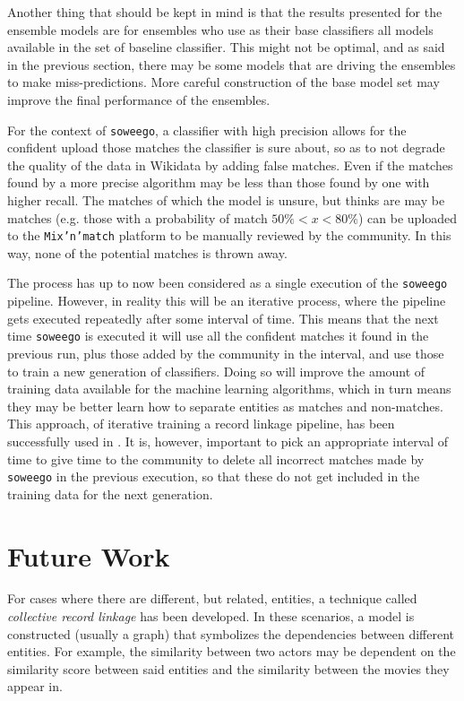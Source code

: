 \documentclass[epsfig,a4paper,11pt,titlepage,twoside,openany]{book}
\newcommand{\soweego}[0]{\texttt{soweego}\xspace}
\begin{document}
Another thing that should be kept in mind is that the results presented for the ensemble models are for ensembles who use as their base classifiers all models available in the set of baseline classifier. This might not be optimal, and as said in the previous section, there may be some models that are driving the ensembles to make miss-predictions. More careful construction of the base model set may improve the final performance of the ensembles. 

For the context of \soweego, a classifier with high precision allows for the confident upload those matches the classifier is sure about, so as to not degrade the quality of the data in Wikidata by adding false matches. Even if the matches found by a more precise algorithm may be less than those found by one with higher recall. The matches of which the model is unsure, but thinks are may be matches (e.g. those with a probability of match $50\% < x < 80\%$) can be uploaded to the \texttt{Mix'n'match} platform to be manually reviewed by the community. In this way, none of the potential matches is thrown away.

The process has up to now been considered as a single execution of the \soweego pipeline. However, in reality this will be an iterative process, where the pipeline gets executed repeatedly after some interval of time. This means that the next time \soweego is executed it will use all the confident matches it found in the previous run, plus those added by the community in the interval, and use those to train a new generation of classifiers. Doing so will improve the amount of training data available for the machine learning algorithms, which in turn means they may be better learn how to separate entities as matches and non-matches. This approach, of iterative training a record linkage pipeline, has been successfully used in \cite{Bhattacharya:2004_iterative}. It is, however, important to pick an appropriate interval of time to give time to the community to delete all incorrect matches made by \soweego in the previous execution, so that these do not get included in the training data for the next generation. 



\section{Future Work}
\label{sec:future-work}

For cases where there are different, but related, entities, a technique called \textit{collective record linkage} \cite{Kalashnikov2006_collective_graph,Dong2005_reference_reconciliation,bhattacharya07_collec_entit_resol_relat_data} has been developed. In these scenarios, a model is constructed (usually a graph) that symbolizes the dependencies between different entities. For example, the similarity between two actors may be dependent on the similarity score between said entities and the similarity between the  movies they appear in.
\end{document}
